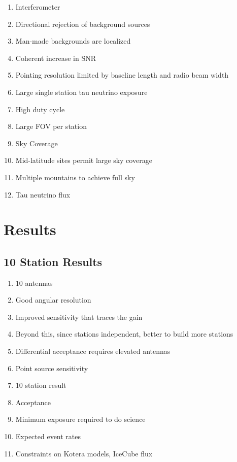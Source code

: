 \documentclass{PoS}
\begin{document}
\begin{enumerate}
    \item Interferometer 
    \item Directional rejection of background sources
    \item Man-made backgrounds are localized
    \item Coherent increase in SNR
    \item Pointing resolution limited by baseline length and radio beam width
    \item Large single station tau neutrino exposure
    \item High duty cycle
    \item Large FOV per station
    \item Sky Coverage
    \item Mid-latitude sites permit large sky coverage
    \item Multiple mountains to achieve full sky
    \item Tau neutrino flux
\end{enumerate}

\section{Results}

\subsection{10 Station Results}
\begin{enumerate}
    \item 10 antennas 
    \item Good angular resolution
    \item Improved sensitivity that traces the gain
    \item Beyond this, since stations independent, better to build more stations
    \item Differential acceptance  requires elevated antennas
    \item Point source sensitivity
    \item 10 station result
    \item Acceptance
    \item Minimum exposure required to do science
    \item Expected event rates
    \item Constraints on Kotera models, IceCube flux
\end{enumerate}
\end{document}
